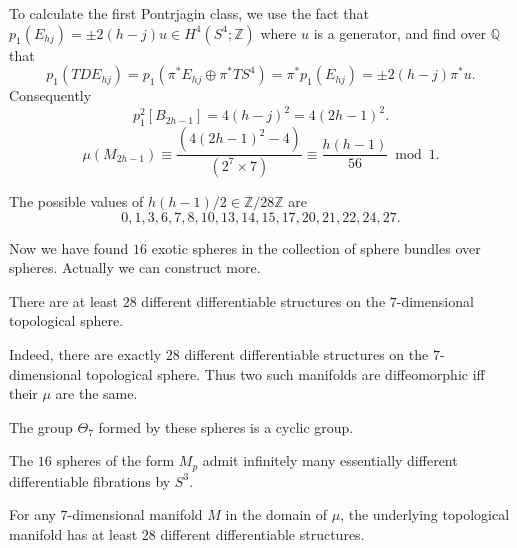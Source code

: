 \documentclass[twoside]{article}
\begin{document}
To calculate the first Pontrjagin class, we use the fact that $p_1(E_{hj}) = \pm 2(h-j)u\in H^4(S^4;\mathbb{Z})$ where $u$ is a generator, and find over $\mathbb{Q}$ that 
\[
    p_1(TDE_{hj}) = p_1(\pi^*E_{hj} \oplus \pi^*TS^4) = \pi^*p_1(E_{hj}) = \pm 2(h-j)\pi^*u. 
\]
Consequently 
\[
    p_1^2[B_{2h-1}] = 4(h-j)^2 = 4(2h-1)^2. 
\]
\[
    \mu(M_{2h-1}) \equiv \frac{(4(2h-1)^2-4)}{(2^{7} \times 7)} \equiv  \frac{h(h-1)}{56} \bmod 1. 
\]

\begin{lem}
    The possible values of ${h(h-1)/2} \in   \mathbb{Z}/28\mathbb{Z}$ are 
\[
    0,1,3,6,7,8,10,13,14,15,17,20,21,22,24,27. 
\]
\end{lem}

Now we have found $16$ exotic spheres in the collection of sphere bundles over spheres. Actually we can construct more. 
\begin{thm}
    There are at least $28$ different differentiable structures on the $7$-dimensional topological sphere. 
\end{thm}

Indeed, there are exactly $28$ different differentiable structures on the $7$-dimensional topological sphere. Thus two such manifolds are diffeomorphic iff their $\mu$ are the same. 

\begin{cor}
    The group $\Theta_7$ formed by these spheres is a cyclic group. 
\end{cor}

\begin{cor}
    The $16$ spheres of the form $M_p$ admit infinitely many essentially different differentiable fibrations by $S^3$. 
\end{cor}


\begin{prop}
    For any $7$-dimensional manifold $M$ in the domain of $\mu$, the underlying topological manifold has at least $28$ different differentiable structures. 
\end{prop}
\end{document}
